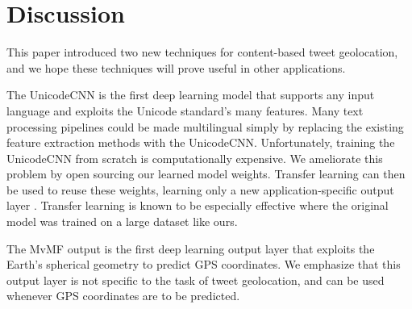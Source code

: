 \documentclass[sigconf,anonymous,review]{acmart}
\begin{document}

\section{Discussion}

This paper introduced two new techniques for content-based tweet geolocation,
and we hope these techniques will prove useful in other applications.

The UnicodeCNN is the first deep learning model that supports any input language and exploits the Unicode standard's many features.
Many text processing pipelines could be made multilingual simply by replacing the existing feature extraction methods with the UnicodeCNN.
Unfortunately, training the UnicodeCNN from scratch is computationally expensive.
We ameliorate this problem by open sourcing our learned model weights.
Transfer learning can then be used to reuse these weights,
learning only a new application-specific output layer \citep{wang2015transfer,howard2018fine}.
Transfer learning is known to be especially effective where the original model was trained on a large dataset like ours.

The MvMF output is the first deep learning output layer that exploits the Earth's spherical geometry to predict GPS coordinates.
We emphasize that this output layer is not specific to the task of tweet geolocation,
and can be used whenever GPS coordinates are to be predicted.


\newpage

\end{document}
